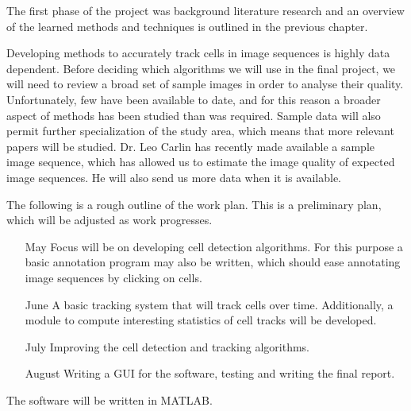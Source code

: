 \documentclass[12pt,a4paper,openany]{book}
\begin{document}
The first phase of the project was background literature research and an overview of the learned methods and techniques is outlined in the previous chapter.

Developing methods to accurately track cells in image sequences is highly data dependent. Before deciding which algorithms we will use in the final project, we will need to review a broad set of sample images in order to analyse their quality. Unfortunately, few have been available to date, and for this reason a broader aspect of methods has been studied than was required. Sample data will also permit further specialization of the study area, which means that more relevant papers will be studied. Dr. Leo Carlin has recently made available a sample image sequence, which has allowed us to estimate the image quality of expected image sequences. He will also send us more data when it is available.

The following is a rough outline of the work plan. This is a preliminary plan, which will be adjusted as work progresses.

\begin{enumerate}
  \item [May] Focus will be on developing cell detection algorithms. For this purpose a basic annotation program may also be written, which should ease annotating image sequences by clicking on cells.
  \item [June] A basic tracking system that will track cells over time. Additionally, a module to compute interesting statistics of cell tracks will be developed.
  \item[July] Improving the cell detection and tracking algorithms. 
  \item [August] Writing a GUI for the software, testing and writing the final report.
\end{enumerate}

The software will be written in MATLAB.



\newpage


\label{page_bibliography}
 
\end{document}
